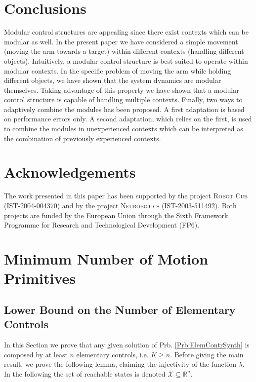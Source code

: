 \documentclass{svmult}
\begin{document}
\section{Conclusions}

Modular control structures are appealing since there exist contexts
which can be modular as well. In the present paper we have
considered a simple movement (moving the arm towards a target)
within different contexts (handling different objects). Intuitively,
a modular control structure is best suited to operate within modular
contexts. In the specific problem of moving the arm while holding
different objects, we have shown that the system dynamics are
modular themselves. Taking advantage of this property we have shown
that a modular control structure is capable of handling multiple
contexts. Finally, two ways to adaptively combine the modules has
been proposed. A first adaptation is based on performance errors
only. A second adaptation, which relies on the first, is used to
combine the modules in unexperienced contexts which can be
interpreted as the combination of previously experienced contexts.

\section*{Acknowledgements}

The work presented in this paper has been supported by the project
\textsc{Robot Cub} (IST-2004-004370) and by the project
\textsc{Neurobotics} (IST-2003-511492). Both projects are funded by
the European Union through the Sixth Framework Programme for
Research and Technological Development (FP6).

\appendix

\section{Minimum Number of Motion Primitives} \label{Sec:MinNumPrimitives}

\subsection{Lower Bound on the Number of Elementary Controls} \label{Sec:LowerBound}

In this Section we prove that any given solution of Prb.
\ref{Prb:ElemContrSynth} is composed by at least $n$
elementary controls, i.e. $K \geq n$. Before giving the main
result, we prove the following lemma, claiming the injectivity of
the function $\lambda$. In the following the set of reachable states
is denoted $\mathcal X \subseteq \mathbb R^n$.
\end{document}
